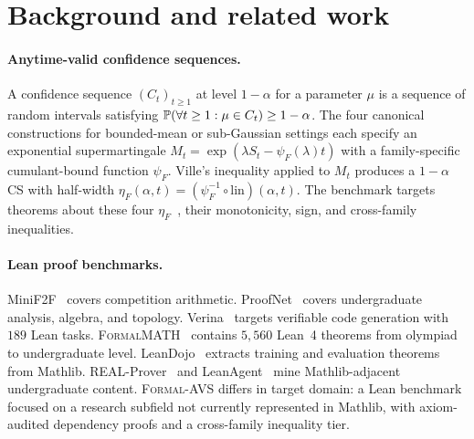 \section{Background and related work}
\label{sec:related}

\paragraph{Anytime-valid confidence sequences.}
A confidence sequence $(C_t)_{t \geq 1}$ at level $1 - \alpha$ for a
parameter $\mu$ is a sequence of random intervals satisfying
$\mathbb{P}(\forall t \geq 1: \mu \in C_t) \geq 1 - \alpha$. The four
canonical constructions for bounded-mean or sub-Gaussian settings
each specify an exponential supermartingale
$M_t = \exp(\lambda S_t - \psi_F(\lambda) t)$ with a family-specific
cumulant-bound function $\psi_F$. Ville's inequality applied to
$M_t$ produces a $1-\alpha$ CS with half-width
$\eta_F(\alpha, t) = (\psi_F^{-1} \circ \text{lin})(\alpha, t)$. The
benchmark targets theorems about these four
$\eta_F$~\cite{howard2021time, waudbysmith2024estimating,
whitehouse2025timeuniform}, their monotonicity, sign, and
cross-family inequalities.

\paragraph{Lean proof benchmarks.}
MiniF2F~\cite{zheng2022minif2f} covers competition arithmetic.
ProofNet~\cite{azerbayev2023proofnet} covers undergraduate
analysis, algebra, and topology.
Verina~\cite{sunblazeverina} targets verifiable code generation
with $189$ Lean tasks. \textsc{FormalMATH}~\cite{formalmath2025}
contains $5{,}560$ Lean~4 theorems from olympiad to
undergraduate level. LeanDojo~\cite{yang2023leandojo} extracts
training and evaluation theorems from Mathlib.
REAL-Prover~\cite{realprover2024} and
LeanAgent~\cite{leanagent2024} mine Mathlib-adjacent
undergraduate content. \textsc{Formal-AVS} differs in target
domain: a Lean benchmark focused on a research subfield not
currently represented in Mathlib, with axiom-audited dependency
proofs and a cross-family inequality tier.

